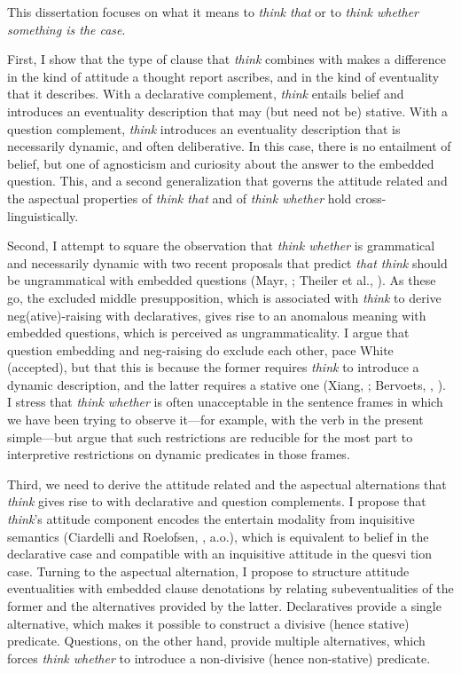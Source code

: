 This dissertation focuses on what it means to \textit{think that} or to \textit{think whether something is the case}.

First, I show that the type of clause that \textit{think} combines with makes a difference in the kind of attitude a thought report ascribes, and in the kind of eventuality that it describes. With a declarative complement, \textit{think} entails belief and introduces an eventuality description that may (but need not be) stative. With a question complement, \textit{think} introduces an eventuality description that is necessarily dynamic, and often deliberative. In this case, there is no entailment of belief, but one of agnosticism and curiosity about the answer to the embedded question. This, and a second generalization that governs the attitude related and the aspectual properties of \textit{think that} and of \textit{think whether} hold cross-linguistically.

Second, I attempt to square the observation that \textit{think whether} is grammatical and necessarily dynamic with two recent proposals that predict \textit{that think} should be ungrammatical with embedded questions (Mayr, \cite*{mayr2019-nls}; Theiler et al., \cite*{theiler-roelofsen-aloni2019-nls}). As these go, the excluded middle presupposition, which is associated with \textit{think} to derive neg(ative)-raising with declaratives, gives rise to an anomalous meaning with embedded questions, which is perceived as ungrammaticality. I argue that question embedding and neg-raising do exclude each other, pace White (accepted), but that this is because the former requires \textit{think} to introduce a dynamic description, and the latter requires a stative one (Xiang, \cite*{xiang2013-plc}; Bervoets, \cite*{bervoets2014-thesis}, \cite*{bervoets2020}). I stress that \textit{think whether} is often unacceptable in the sentence frames in which we have been trying to observe it—for example, with the verb in the present simple—but argue that such restrictions are reducible for the most part to interpretive restrictions on dynamic predicates in those frames.

Third, we need to derive the attitude related and the aspectual alternations that \textit{think} gives rise to with declarative and question complements. I propose that \textit{think}'s attitude component encodes the entertain modality from inquisitive semantics (Ciardelli and Roelofsen, \cite*{ciardelli-roelofsen2015-synthese}, a.o.), which is equivalent to belief in the declarative case and compatible with an inquisitive attitude in the quesvi tion case. Turning to the aspectual alternation, I propose to structure attitude eventualities with embedded clause denotations by relating subeventualities of the former and the alternatives provided by the latter. Declaratives provide a single alternative, which makes it possible to construct a divisive (hence stative) predicate. Questions, on the other hand, provide multiple alternatives, which forces \textit{think whether} to introduce a non-divisive (hence non-stative) predicate.

